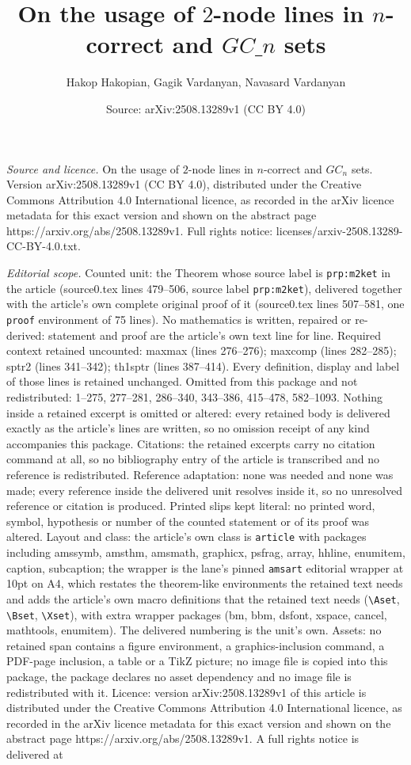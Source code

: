 \documentclass[10pt,a4paper]{amsart}
\title[On the usage of $2$-node lines in $n$-correct and $GC\_n$ set]{On the usage of $2$-node lines in $n$-correct and $GC\_n$ sets}
\author{Hakop Hakopian, Gagik Vardanyan, Navasard Vardanyan}
\date{Source: arXiv:2508.13289v1 (CC BY 4.0)}
\begin{document}
\maketitle

\noindent\emph{Source and licence.} On the usage of $2$-node lines in $n$-correct and $GC_n$ sets. Version arXiv:2508.13289v1 (CC BY 4.0), distributed under the Creative Commons Attribution 4.0 International licence, as recorded in the arXiv licence metadata for this exact version and shown on the abstract page https://arxiv.org/abs/2508.13289v1. Full rights notice: licenses/arxiv-2508.13289-CC-BY-4.0.txt.\par\smallskip

\noindent\textit{Editorial scope.} Counted unit: the Theorem whose source label is \texttt{prp:m2ket} in the article (source0.tex lines 479--506, source label \texttt{prp:m2ket}), delivered together with the article's own complete original proof of it (source0.tex lines 507--581, one \texttt{proof} environment of 75 lines). No mathematics is written, repaired or re-derived: statement and proof are the article's own text line for line. Required context retained uncounted: maxmax (lines 276--276); maxcomp (lines 282--285); sptr2 (lines 341--342); th1sptr (lines 387--414). Every definition, display and label of those lines is retained unchanged. Omitted from this package and not redistributed: 1--275, 277--281, 286--340, 343--386, 415--478, 582--1093. Nothing inside a retained excerpt is omitted or altered: every retained body is delivered exactly as the article's lines are written, so no omission receipt of any kind accompanies this package. Citations: the retained excerpts carry no citation command at all, so no bibliography entry of the article is transcribed and no reference is redistributed. Reference adaptation: none was needed and none was made; every reference inside the delivered unit resolves inside it, so no unresolved reference or citation is produced. Printed slips kept literal: no printed word, symbol, hypothesis or number of the counted statement or of its proof was altered. Layout and class: the article's own class is \texttt{article} with packages including amssymb, amsthm, amsmath, graphicx, psfrag, array, hhline, enumitem, caption, subcaption; the wrapper is the lane's pinned \texttt{amsart} editorial wrapper at 10pt on A4, which restates the theorem-like environments the retained text needs and adds the article's own macro definitions that the retained text needs (\texttt{\textbackslash Aset}, \texttt{\textbackslash Bset}, \texttt{\textbackslash Xset}), with extra wrapper packages (bm, bbm, dsfont, xspace, cancel, mathtools, enumitem). The delivered numbering is the unit's own. Assets: no retained span contains a figure environment, a graphics-inclusion command, a PDF-page inclusion, a table or a TikZ picture; no image file is copied into this package, the package declares no asset dependency and no image file is redistributed with it. Licence: version arXiv:2508.13289v1 of this article is distributed under the Creative Commons Attribution 4.0 International licence, as recorded in the arXiv licence metadata for this exact version and shown on the abstract page https://arxiv.org/abs/2508.13289v1. A full rights notice is delivered at 
\end{document}

